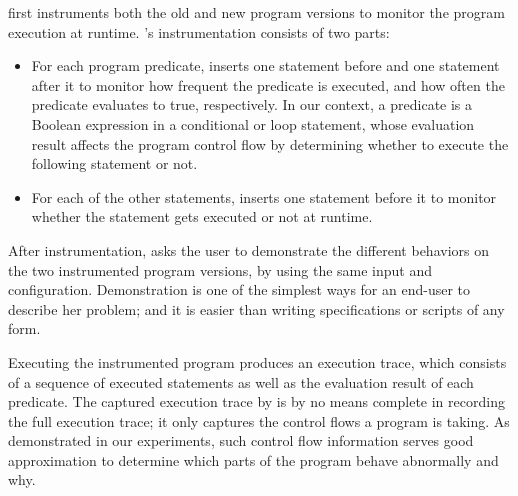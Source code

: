 \ourtool first instruments both the old and new program versions
to monitor the program  execution at runtime. \ourtool's instrumentation
consists of two parts:

\vspace{-2mm}

\begin{itemize}
\item For each program predicate, \ourtool inserts one
statement before and one statement after it
to monitor how frequent the predicate is executed, and
how often the predicate evaluates to true, respectively. In our
context, a predicate is a Boolean expression in a
conditional or loop statement,
whose evaluation result affects the program
control flow by determining whether to execute the
following statement or not.


\item For each of the other statements, \ourtool inserts
one statement before it to monitor whether the statement
gets executed or not at runtime.
\end{itemize}


\vspace{-1mm}

After instrumentation, \ourtool asks the user to demonstrate the different
behaviors on the two instrumented program versions, by using
the same input and configuration. Demonstration is
one of the simplest ways for an end-user to describe her problem;
and it is easier than writing specifications or scripts of any form.

Executing the instrumented program produces an execution trace,
which consists of a sequence of executed statements as well
as the evaluation result of each predicate.
The captured execution trace by \ourtool is by no means complete
in recording the full execution trace;  it only
captures the control flows a program is taking. As demonstrated
in our experiments, such control flow information serves
good approximation to determine which parts of the program behave
abnormally and why.



